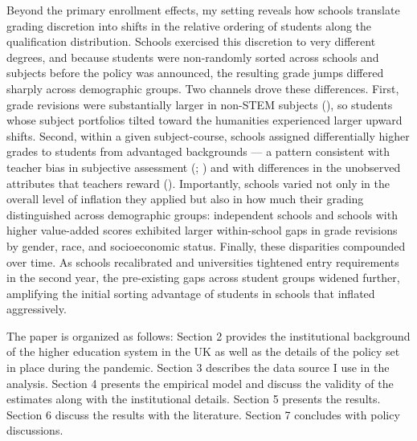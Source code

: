 Beyond the primary enrollment effects, my setting reveals how schools translate grading discretion into shifts in the relative ordering of students along the qualification distribution. Schools exercised this discretion to very different degrees, and because students were non-randomly sorted across schools and subjects before the policy was announced, the resulting grade jumps differed sharply across demographic groups. Two channels drove these differences. First, grade revisions were substantially larger in non-STEM subjects (\cite{Ahn2024}), so students whose subject portfolios tilted toward the humanities experienced larger upward shifts. Second, within a given subject-course, schools assigned differentially higher grades to students from advantaged backgrounds — a pattern consistent with teacher bias in subjective assessment (\cite{hanna2012}; \cite{Alesina2024}) and with differences in the unobserved attributes that teachers reward (\cite{cornwell2013}). Importantly, schools varied not only in the overall level of inflation they applied but also in how much their grading distinguished across demographic groups: independent schools and schools with higher value-added scores exhibited larger within-school gaps in grade revisions by gender, race, and socioeconomic status. Finally, these disparities compounded over time. As schools recalibrated and universities tightened entry requirements in the second year, the pre-existing gaps across student groups widened further, amplifying the initial sorting advantage of students in schools that inflated aggressively.

The paper is organized as follows: Section 2 provides the institutional background of the higher education system in the UK as well as the details of the policy set in place during the pandemic. Section 3 describes the data source I use in the analysis. Section 4 presents the empirical model and discuss the validity of the estimates along with the institutional details. Section 5 presents the results. Section 6 discuss the results with the literature. Section 7 concludes with policy discussions. 